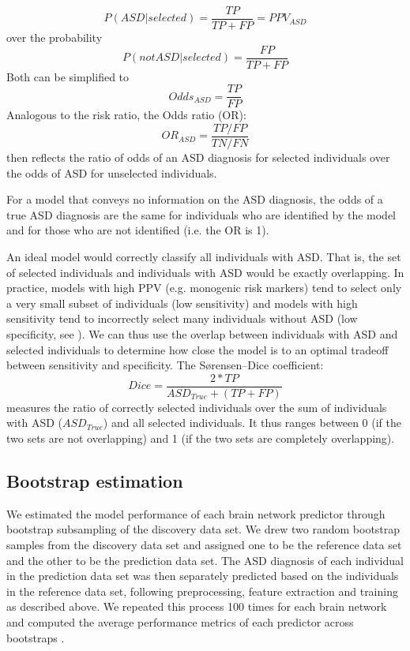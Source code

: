 \documentclass[9pt,lineno]{elife}
\begin{document}
\begin{equation}
\label{eq:prob_ASD}
P(ASD|selected) = \frac{TP}{TP+FP}=PPV_{ASD}
\end{equation}
over the probability
\begin{equation}
\label{eq:prob_notASD}
P(not ASD|selected) = \frac{FP}{TP+FP}
\end{equation}
Both can be simplified to
\begin{equation}
\label{eq:odds_ASD}
Odds_{ASD} = \frac{TP}{FP}
\end{equation}
Analogous to the risk ratio, the Odds ratio (OR):
\begin{equation}
\label{eq:odds_ratio}
OR_{ASD} = \frac{TP/FP}{TN/FN}
\end{equation}
then reflects the ratio of odds of an ASD diagnosis for selected individuals over the odds of ASD for unselected individuals. 

For a model that conveys no information on the ASD diagnosis, the odds of a true ASD diagnosis are the same for individuals who are identified by the model and for those who are not identified (i.e. the OR is 1). 

An ideal model would correctly classify all individuals with ASD. That is, the set of selected individuals and individuals with ASD would be exactly overlapping. In practice, models with high PPV (e.g. monogenic risk markers) tend to select only a very small subset of individuals (low sensitivity) and models with high sensitivity tend to incorrectly select many individuals without ASD (low specificity, see ). We can thus use the overlap between individuals with ASD and selected individuals to determine how close the model is to an optimal tradeoff between sensitivity and specificity. The Sørensen–Dice coefficient:
\begin{equation}
\label{eq:dice}
Dice = \frac{2*TP}{ASD_{True}+(TP+FP)}
\end{equation}
measures the ratio of correctly selected individuals over the sum of individuals with ASD ($ASD_{True}$) and all selected individuals. It thus ranges between 0 (if the two sets are not overlapping) and 1 (if the two sets are completely overlapping).

\subsection{Bootstrap estimation}
We estimated the model performance of each brain network predictor through bootstrap subsampling of the discovery data set. We drew two random bootstrap samples from the discovery data set and assigned one to be the reference data set and the other to be the prediction data set. The ASD diagnosis of each individual in the prediction data set was then separately predicted based on the individuals in the reference data set, following preprocessing, feature extraction and training as described above. We repeated this process 100 times for each brain network and computed the average performance metrics of each predictor across bootstraps \citep[see, e.g.][regarding bootstrap predictor evaluation methods]{Efron1983-ft}.
\end{document}
